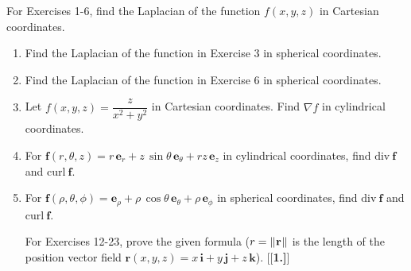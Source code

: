 \par\noindent For Exercises 1-6, find the Laplacian of the function $f(x,y,z)$ in Cartesian coordinates.
\begin{enumerate}[\bfseries 1.]
 \item Find the Laplacian of the function in Exercise 3 in spherical coordinates.
 \item Find the Laplacian of the function in Exercise 6 in spherical coordinates.
 \item Let $f(x,y,z) = \dfrac{z}{x^2 + y^2}$ in Cartesian coordinates. Find $\nabla f$ in cylindrical coordinates.
 \item For $\textbf{f}(r,\theta,z) = r\,\textbf{e}_{r} + z\,\sin\theta\,\textbf{e}_{\theta} + rz\,\textbf{e}_{z}$ in
  cylindrical coordinates, find $\text{div}~\textbf{f}$ and $\text{curl}~\textbf{f}$.
 \item For $\textbf{f}(\rho,\theta,\phi) = \textbf{e}_{\rho} + \rho\,\cos\theta\,\textbf{e}_{\theta} +
  \rho\,\textbf{e}_{\phi}$ in spherical coordinates, find $\text{div}~\textbf{f}$ and $\text{curl}~\textbf{f}$.
\par\noindent For Exercises 12-23, prove the given formula ($r = \lVert\mspace{1mu}\textbf{r}\mspace{1mu}\rVert$ is the length of the position
vector field $\textbf{r}(x,y,z) = x\,\textbf{i} + y\,\textbf{j} +z\,\textbf{k}$).
[{[\bfseries 1.]}]
\end{enumerate}
